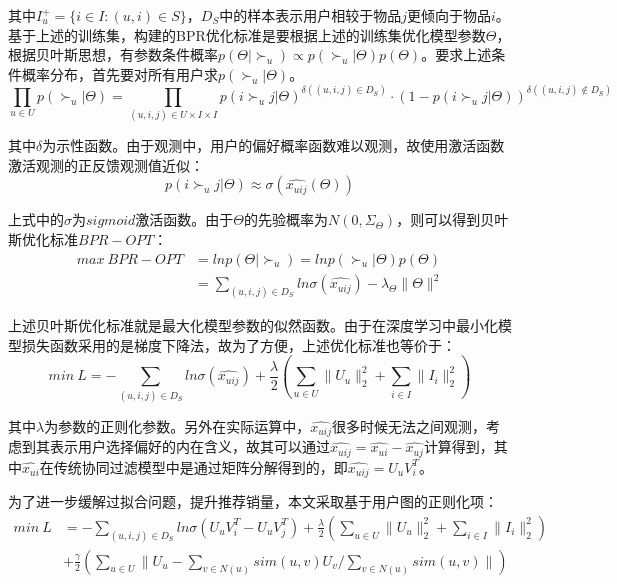 \documentclass[lang=cn,11pt,a4paper,cite=authoryear]{elegantpaper}
\begin{document}
其中$I_u^+ = \{i \in I: (u, i) \in S\}$，$D_S$中的样本表示用户相较于物品$j$更倾向于物品$i$。基于上述的训练集，构建的BPR优化标准是要根据上述的训练集优化模型参数$\Theta$，根据贝叶斯思想，有参数条件概率$p(\Theta|\succ_u) \varpropto p(\succ_u|\Theta)p(\Theta)$。要求上述条件概率分布，首先要对所有用户求$p(\succ_u|\Theta)$。
\begin{equation}
  \prod_{u \in U}p(\succ_u|\Theta)=\prod_{(u, i, j) \in U \times I \times I}p(i \succ_u j|\Theta)^{\delta((u, i, j)\in D_S)} \cdot (1- p(i \succ_u j|\Theta))^{\delta((u, i, j) \notin D_S)}
\end{equation}

其中$\delta$为示性函数。由于观测中，用户的偏好概率函数难以观测，故使用激活函数激活观测的正反馈观测值近似：
\begin{equation}
  p(i \succ_u j|\Theta) \approx \sigma(\hat{x_{uij}}(\Theta))
\end{equation}

上式中的$\sigma$为$sigmoid$激活函数。由于$\Theta$的先验概率为$N(0, \Sigma_{\Theta})$，则可以得到贝叶斯优化标准$BPR-OPT$：
\begin{equation}
  \begin{split}
    max \ BPR-OPT &= ln p(\Theta|\succ_u) = ln p(\succ_u|\Theta)p(\Theta) \\
  &= \sum_{(u, i, j)\in D_S}ln\sigma(\hat{x_{uij}}) - \lambda_{\Theta}\parallel \Theta \parallel^2
  \end{split}
\end{equation}

上述贝叶斯优化标准就是最大化模型参数的似然函数。由于在深度学习中最小化模型损失函数采用的是梯度下降法，故为了方便，上述优化标准也等价于：
\begin{equation}
  min \ L = -\sum_{(u, i, j)\in D_S}ln\sigma(\hat{x_{uij}}) + \frac{\lambda}{2}(\sum_{u \in U}\parallel U_u \parallel_2^2+\sum_{i \in I}\parallel I_i \parallel_2^2)
\end{equation}

其中$\lambda$为参数的正则化参数。另外在实际运算中，$\hat{x_{uij}}$很多时候无法之间观测，考虑到其表示用户选择偏好的内在含义，故其可以通过$\hat{x_{uij}} = \hat{x_{ui}}-\hat{x_{uj}}$计算得到，其中$\hat{x_{ui}}$在传统协同过滤模型中是通过矩阵分解得到的，即$\hat{x_{uij}} = U_uV_i^T$。

为了进一步缓解过拟合问题，提升推荐销量，本文采取基于用户图的正则化项：
\begin{equation}
  \begin{split}
    min \ L &= -\sum_{(u, i, j)\in D_S}ln\sigma(U_uV_i^T-U_uV_j^T) + \frac{\lambda}{2}(\sum_{u \in U}\parallel U_u \parallel_2^2+\sum_{i \in I}\parallel I_i \parallel_2^2) \\
    &+\frac{\gamma}{2}(\sum_{u\in U}\parallel U_u-\sum_{v\in N(u)}sim(u,v)U_v / \sum_{v\in N(u)}sim(u,v) \parallel)
  \end{split}
\end{equation}
\end{document}
